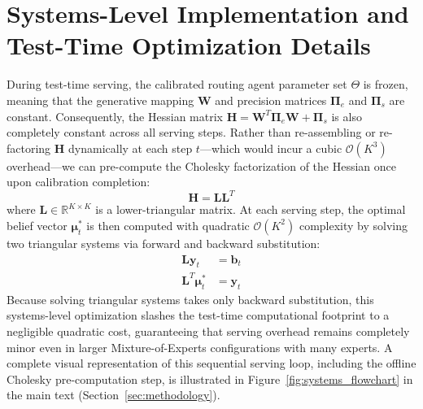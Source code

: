 \documentclass{article}
\theoremstyle{plain}
\theoremstyle{definition}
\theoremstyle{remark}
\begin{document}
\section{Systems-Level Implementation and Test-Time Optimization Details}
\label{app:systems_optimization}

During test-time serving, the calibrated routing agent parameter set $\Theta$ is frozen, meaning that the generative mapping $\mathbf{W}$ and precision matrices $\mathbf{\Pi}_e$ and $\mathbf{\Pi}_s$ are constant. Consequently, the Hessian matrix $\mathbf{H} = \mathbf{W}^T \mathbf{\Pi}_e \mathbf{W} + \mathbf{\Pi}_s$ is also completely constant across all serving steps. Rather than re-assembling or re-factoring $\mathbf{H}$ dynamically at each step $t$—which would incur a cubic $\mathcal{O}(K^3)$ overhead—we can pre-compute the Cholesky factorization of the Hessian once upon calibration completion:
\begin{equation}
\mathbf{H} = \mathbf{L} \mathbf{L}^T
\end{equation}
where $\mathbf{L} \in \mathbb{R}^{K \times K}$ is a lower-triangular matrix. At each serving step, the optimal belief vector $\mathbf{\mu}_t^*$ is then computed with quadratic $\mathcal{O}(K^2)$ complexity by solving two triangular systems via forward and backward substitution:
\begin{align}
\mathbf{L} \mathbf{y}_t &= \mathbf{b}_t \\
\mathbf{L}^T \mathbf{\mu}_t^* &= \mathbf{y}_t
\end{align}
Because solving triangular systems takes only backward substitution, this systems-level optimization slashes the test-time computational footprint to a negligible quadratic cost, guaranteeing that serving overhead remains completely minor even in larger Mixture-of-Experts configurations with many experts. A complete visual representation of this sequential serving loop, including the offline Cholesky pre-computation step, is illustrated in Figure~\ref{fig:systems_flowchart} in the main text (Section~\ref{sec:methodology}).
\end{document}
